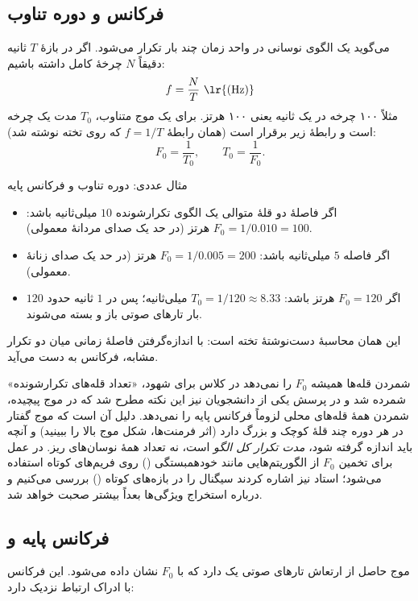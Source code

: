 \subsection{فرکانس و دوره تناوب}
 می‌گوید یک الگوی نوسانی در واحد زمان چند بار تکرار می‌شود. اگر در بازهٔ $T$ ثانیه دقیقاً $N$ چرخهٔ کامل داشته باشیم:
\[
f=\frac{N}{T}\ \text{\lr{(Hz)}}
\]
مثلاً ۱۰۰ چرخه در یک ثانیه یعنی ۱۰۰ هرتز. برای یک موج متناوب،  $T_0$ مدت یک چرخه است و رابطهٔ زیر برقرار است (همان رابطهٔ $f=1/T$ که روی تخته نوشته شد):
\[
F_0=\frac{1}{T_0},\qquad T_0=\frac{1}{F_0}.
\]

\begin{addedbox}{مثال عددی: دوره تناوب و فرکانس پایه}
\begin{itemize}
  \item اگر فاصلهٔ دو قلهٔ متوالی یک الگوی تکرارشونده $10$ میلی‌ثانیه باشد: $F_0=1/0.010=100$ هرتز (در حد یک صدای مردانهٔ معمولی).
  \item اگر فاصله $5$ میلی‌ثانیه باشد: $F_0=1/0.005=200$ هرتز (در حد یک صدای زنانهٔ معمولی).
  \item اگر $F_0=120$ هرتز باشد: $T_0=1/120\approx 8.33$ میلی‌ثانیه؛ پس در $1$ ثانیه حدود $120$ بار تارهای صوتی باز و بسته می‌شوند.
\end{itemize}
این همان محاسبهٔ دست‌نوشتهٔ تخته است: با اندازه‌گرفتن فاصلهٔ زمانی میان دو تکرار مشابه، فرکانس به دست می‌آید.
\end{addedbox}

\begin{correctionbox}{شمردن قله‌ها همیشه $F_0$ را نمی‌دهد}
در کلاس برای شهود، «تعداد قله‌های تکرارشونده» شمرده شد و در پرسش یکی از دانشجویان نیز این نکته مطرح شد که در موج پیچیده، شمردن همهٔ قله‌های محلی لزوماً فرکانس پایه را نمی‌دهد. دلیل آن است که موج گفتار در هر دوره چند قلهٔ کوچک و بزرگ دارد (اثر فرمنت‌ها، شکل موج بالا را ببینید) و آنچه باید اندازه گرفته شود، \emph{مدت تکرار کل الگو} است، نه تعداد همهٔ نوسان‌های ریز. در عمل برای تخمین $F_0$ از الگوریتم‌هایی مانند خودهمبستگی () روی فریم‌های کوتاه استفاده می‌شود؛ استاد نیز اشاره کردند سیگنال را در بازه‌های کوتاه () بررسی می‌کنیم و درباره استخراج ویژگی‌ها بعداً بیشتر صحبت خواهد شد.
\end{correctionbox}

\subsection{فرکانس پایه و }
موج حاصل از ارتعاش تارهای صوتی یک  دارد که با $F_0$ نشان داده می‌شود. این فرکانس با ادراک  ارتباط نزدیک دارد:

